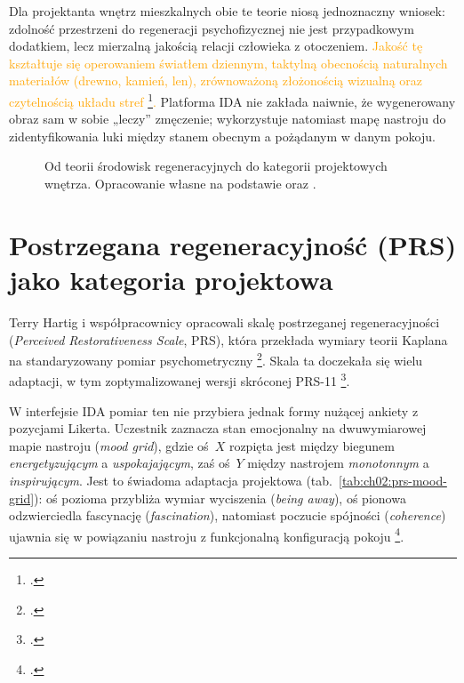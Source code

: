 Dla projektanta wnętrz mieszkalnych obie te teorie niosą jednoznaczny wniosek: zdolność przestrzeni do regeneracji psychofizycznej nie jest przypadkowym dodatkiem, lecz mierzalną jakością relacji człowieka z otoczeniem. \textcolor{orange}{Jakość tę kształtuje się operowaniem światłem dziennym, taktylną obecnością naturalnych materiałów (drewno, kamień, len), zrównoważoną złożonością wizualną oraz czytelnością układu stref \footcite{pallasmaa2012oczy}.}
Platforma IDA nie zakłada naiwnie, że wygenerowany obraz sam w sobie „leczy” zmęczenie; wykorzystuje natomiast mapę nastroju do zidentyfikowania luki między stanem obecnym a pożądanym w danym pokoju.

\begin{figure}[htbp]
  \centering
  \caption[Od teorii środowisk regeneracyjnych do kategorii projektowych wnętrza. Opracowanie własne na podstawie Kaplana oraz Ulricha.]{Od teorii środowisk regeneracyjnych do kategorii projektowych wnętrza.
    Opracowanie własne na podstawie \textcite{kaplan1995restorative} oraz \textcite{ulrich1984window,ulrich1991stress}.}
  \label{fig:ch02:restorative-framework}
\end{figure}

\section{Postrzegana regeneracyjność (PRS) jako kategoria projektowa}
\label{ch02:sec:prs}

Terry Hartig i współpracownicy opracowali skalę postrzeganej regeneracyjności (\emph{Perceived Restorativeness Scale}, PRS), która przekłada wymiary teorii Kaplana na standaryzowany pomiar psychometryczny \footcite{hartig1997prs}. Skala ta doczekała się wielu adaptacji, w tym zoptymalizowanej wersji skróconej PRS-11 \footcite{pasini2014prs11}.

W interfejsie IDA pomiar ten nie przybiera jednak formy nużącej ankiety z pozycjami Likerta. Uczestnik zaznacza stan emocjonalny na dwuwymiarowej mapie nastroju (\emph{mood grid}), gdzie oś~$X$ rozpięta jest między biegunem \emph{energetyzującym} a \emph{uspokajającym}, zaś oś~$Y$ między nastrojem \emph{monotonnym} a \emph{inspirującym}.
Jest to świadoma adaptacja projektowa (tab.~\ref{tab:ch02:prs-mood-grid}): oś pozioma przybliża wymiar wyciszenia (\emph{being away}), oś pionowa odzwierciedla fascynację (\emph{fascination}), natomiast poczucie spójności (\emph{coherence}) ujawnia się w powiązaniu nastroju z funkcjonalną konfiguracją pokoju \footcite{idaPlatform2026}.

